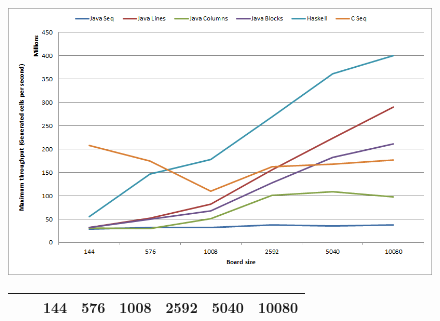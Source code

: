 \documentclass[a4paper]{article}
\begin{document}
    \begin{figure}[h]
        \centering
        \includegraphics[width=0.75\linewidth]{results/board_size_impact.png}

        \begin{tabular}{  ll | l  l  l  l  l  l }
            & & 144 & 576 & 1008 & 2592 & 5040 & 10080 \\ \hline


\end{tabular}
\end{figure}
\end{document}
